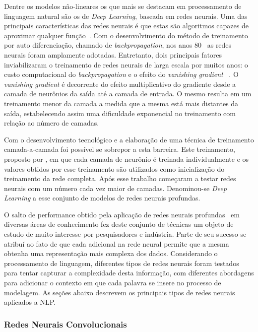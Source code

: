 Dentre os modelos não-lineares os que mais se destacam em processamento de
linguagem natural são os de \textit{Deep Learning}, baseada em redes neurais.
Uma das principais características das redes neurais é que estas são algoritmos
capazes de aproximar qualquer função~\cite{hornik89}.
Com o desenvolvimento do método de treinamento por auto diferenciação, chamado
de \textit{backpropagation}, nos anos 80~\cite{werbos82} as redes neurais
foram amplamente adotadas.
Entretanto, dois principais fatores inviabilizaram o treinamento de redes
neurais de larga escala por muitos anos: o custo computacional do
\textit{backpropagation} e o efeito do \textit{vanishing gradient}~
\cite{hochreiter98}.
O \textit{vanishing gradient} é decorrente do efeito multiplicativo do
gradiente desde a camada de neurônios da saída até a camada de entrada.
O mesmo resulta em um treinamento menor da camada a medida que a mesma está
mais distantes da saída, estabelecendo assim uma dificuldade exponencial no
treinamento com relação ao número de camadas.

Com o desenvolvimento tecnológico e a elaboração de uma técnica de treinamento
camada-a-camada foi possível se sobrepor a esta barreira.
Este treinamento, proposto por \citet{hinton06}, em que cada camada de neurônio
é treinada individualmente e os valores obtidos por esse treinamento são
utilizados como inicialização do treinamento da rede completa.
Após esse trabalho começaram a testar redes neurais com um número cada vez
maior de camadas.
Denominou-se \textit{Deep Learning} a esse conjunto de modelos de redes neurais
profundas.

O salto de performance obtido pela aplicação de redes neurais
profundas~\cite{lecun15} em diversas áreas de conhecimento fez deste conjunto de
técnicas um objeto de estudo de muito interesse por pesquisadores e indústria.
Parte de seu sucesso se atribuí ao fato de que cada adicional na rede neural
permite que a mesma obtenha uma representação mais complexa dos dados.
Considerando o processamento de linguagem, diferentes tipos de redes neurais
foram testados para tentar capturar a complexidade desta informação,
com diferentes abordagens para adicionar o contexto em que cada palavra se
insere no processo de modelagem.
As seções abaixo descrevem os principais tipos de redes neurais aplicados a NLP.


\subsubsection{Redes Neurais Convolucionais}

